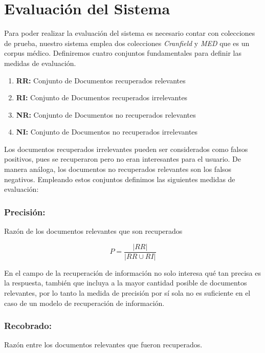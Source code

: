 \documentclass[runningheads,a4paper]{llncs}
\begin{document}

\section{Evaluación del Sistema}

Para poder realizar la evaluación del sistema es necesario contar con colecciones de prueba, nuestro sistema emplea dos colecciones \textit{Cranfield} y \textit{MED} que es un corpus médico. Definiremos cuatro conjuntos fundamentales para definir las medidas de evaluación. 

\begin{enumerate}
	\item[] \textbf{RR:} Conjunto de Documentos recuperados relevantes
	\item[] \textbf{RI:} Conjunto de Documentos recuperados irrelevantes
	\item[] \textbf{NR:} Conjunto de Documentos no recuperados relevantes
	\item[] \textbf{NI:} Conjunto de Documentos no recuperados irrelevantes
\end{enumerate}

Los documentos recuperados irrelevantes pueden ser considerados como falsos
positivos, pues se recuperaron pero no eran interesantes para el usuario. De
manera análoga, los documentos no recuperados relevantes son los falsos
negativos. Empleando estos conjuntos definimos las siguientes medidas de evaluación:

\subsubsection*{Precisión:} Razón de los documentos relevantes que son recuperados

\begin{equation}
	P = \frac{|RR|}{|RR \cup RI|}
\end{equation}

En el campo de la recuperación de información no solo interesa qué tan precisa es la
respuesta, también que incluya a la mayor cantidad posible de documentos
relevantes, por lo tanto la medida de precisión por sí sola no es suficiente en
el caso de un modelo de recuperación de información.

\subsubsection*{Recobrado:} Razón entre los documentos relevantes que fueron recuperados.
\end{document}
